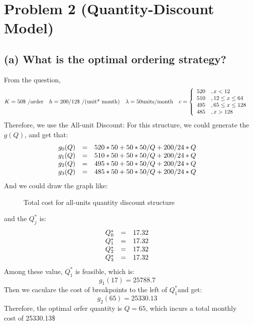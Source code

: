 \documentclass[a4paper,12pt]{journal}
\begin{document}
	\section*{Problem 2 (Quantity-Discount Model)}
	\subsection*{(a) What is the optimal ordering strategy?}
	From the question, 
	\begin{equation}
		K=50\text{\$ /order}\quad h=200/12\text{\$ /(unit* month)}\quad \lambda=50\text{units/month}\quad c=\left\{\begin{array}{l l}
				520&, x<12\\
				510&, 12\leq x\leq 64\\
				495&, 65\leq x\leq 128\\
				485&, x>128\\
		\end{array}\right.
	\end{equation}
	Therefore, we use the All-unit Discount:
	For this structure, we could generate the $g(Q)$, and get that:
	\begin{equation}
		\begin{array}{r c l}
			g_0(Q)&=&520*50+50*50/Q+200/24*Q\\
			g_1(Q)&=&510*50+50*50/Q+200/24*Q\\
			g_2(Q)&=&495*50+50*50/Q+200/24*Q\\
			g_3(Q)&=&485*50+50*50/Q+200/24*Q\\
		\end{array}
	\end{equation}
	And we could draw the graph like:
	\begin{figure}[h]
		\caption{Total cost for all-units quantity discount structure}
	\end{figure}
	and the $Q_j^\ast$ is:
	\begin{equation}
		\begin{array}{r c l}
			Q_0^\ast&=&17.32\\
			Q_1^\ast&=&17.32\\
			Q_2^\ast&=&17.32\\
			Q_3^\ast&=&17.32\\
		\end{array}
	\end{equation}
	Among these value, $Q_1^\ast$ is feasible, which is:
	$$g_1(17)=25788.7$$
	Then we caculare the cost of breakpoints to the left of $Q_1^\ast$and get:\\
	$$g_2(65)=25330.13$$
	Therefore, the optimal orfer quantity is $Q=65$, which incurs a total monthly cost of 25330.13\$
\end{document}
